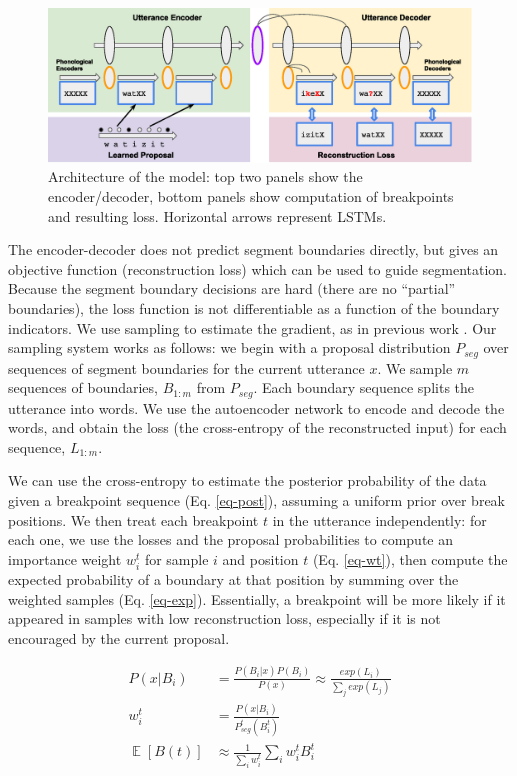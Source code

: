 \documentclass[11pt,letterpaper]{article}
\DeclareMathOperator*{\Exp}{\mathbb{E}}
\begin{document}
\begin{figure}
\includegraphics[width=\textwidth]{arch.eps}
\caption{Architecture of the model: top two panels show the
  encoder/decoder, bottom panels show computation of breakpoints and
  resulting loss. Horizontal arrows represent LSTMs.}
\label{fig-arch}
\end{figure}

The encoder-decoder does not predict segment boundaries directly, but
gives an objective function (reconstruction loss) which can be used to
guide segmentation. Because the segment boundary decisions are hard
(there are no ``partial'' boundaries), the loss function is not
differentiable as a function of the boundary indicators. We use
sampling to estimate the gradient, as in previous work
\cite{Mnih14,Xu15}. Our sampling system works as follows: we
begin with a proposal distribution $P_{seg}$ over sequences of segment
boundaries for the current utterance $x$. We sample $m$ sequences of
boundaries, $B_{1:m}$ from $P_{seg}$. Each boundary sequence splits
the utterance into words. We use the autoencoder network to encode and
decode the words, and obtain the loss (the cross-entropy of the
reconstructed input) for each sequence, $L_{1:m}$.

We can use the cross-entropy to estimate the posterior probability of
the data given a breakpoint sequence (Eq. \ref{eq-post}), assuming a
uniform prior over break positions. We then treat each breakpoint $t$
in the utterance independently: for each one, we use the losses and
the proposal probabilities to compute an importance weight $w_i^t$ for
sample $i$ and position $t$ (Eq. \ref{eq-wt}), then compute the
expected probability of a boundary at that position by summing over
the weighted samples (Eq. \ref{eq-exp}).  Essentially, a breakpoint
will be more likely if it appeared in samples with low reconstruction
loss, especially if it is not encouraged by the current proposal.

\begin{align}
P(x|B_i) &= \frac{P(B_i|x)P(B_i)}{P(x)} \approx \frac{exp(L_i)}{\sum_j
  exp(L_j)}
\label{eq-post}\\
w_i^t &= \frac{P(x|B_i)}{P_{seg}^t(B_i^t)}
\label{eq-wt}\\
\Exp[B(t)] &\approx \frac{1}{\sum_i w_i^t} \sum_i w_i^t B_i^t
\label{eq-exp}
\end{align}
\end{document}
